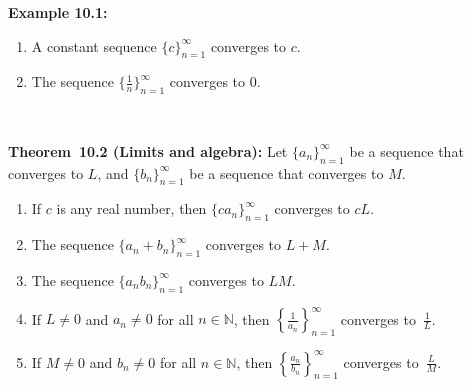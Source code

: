 \documentclass[12pt]{amsart}
\newcommand{\N}{\mathbb{N}}
\numberwithin{equation}{section}
\theoremstyle{plain} %
\theoremstyle{definition}
\theoremstyle{remark}
\begin{document}
\begin{framed}
\noindent \textbf{Example 10.1:}
\begin{enumerate}
\item A constant sequence $\{c\}_{n=1}^\infty$ converges to $c$.
\item The sequence $\{\frac{1}{n}\}_{n=1}^\infty$ converges to $0$.
\end{enumerate}

\

\noindent \textbf{Theorem~10.2 (Limits and algebra):}
Let $\{a_n\}_{n=1}^\infty$ be a sequence that converges to $L$, and $\{b_n\}_{n=1}^\infty$ be a sequence that converges to $M$.
\begin{enumerate}
\item If $c$ is any real number, then $\{ c a_n\}_{n=1}^\infty$ converges to $cL$.
\item The sequence $\{a_n + b_n\}_{n=1}^\infty$ converges to $L+M$.
\item The sequence $\{a_n b_n\}_{n=1}^\infty$ converges to $LM$.
\item If $L\neq 0$ and $a_n\neq 0$ for all $n\in \N$, then $\displaystyle\left\{\frac{1}{a_n}\right\}_{n=1}^\infty$\!\!\! converges to~$\displaystyle \frac{1}{L}$.
\item If $M\neq 0$ and $b_n\neq 0$ for all $n\in \N$, then $\displaystyle\left\{\frac{a_n}{b_n}\right\}_{n=1}^\infty$\!\!\! converges to~$\displaystyle \frac{L}{M}$.
\end{enumerate}
\end{framed}
\end{document}
